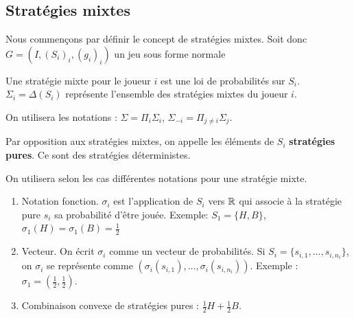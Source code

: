 \subsection{Stratégies mixtes}
Nous commençons par définir le concept de stratégies mixtes. Soit
donc $G = (I, (S_i)_i, (g_i)_i)$ un jeu sous forme normale

\begin{definition} Une strat\'egie mixte pour le joueur
$i$ est une loi de probabilit\'es sur $S_i$. $\Sigma_i
=\Delta(S_i)$ repr\'esente l'ensemble des strat\'egies
mixtes du joueur $i$. %
\end{definition}

On utilisera les notations : $\Sigma = \Pi_i \Sigma_i$,
$\Sigma_{-i} = \Pi_{j\neq i} \Sigma_j$.

Par opposition aux stratégies mixtes, on appelle les éléments de
$S_i$ {\bf stratégies pures}. Ce sont des stratégies
déterministes.

On utilisera selon les cas différentes notations pour une
stratégie mixte.
\begin{enumerate}
\item Notation fonction. $\sigma_i$ est l'application de $S_i$
vers $\mathbb R$ qui associe à la stratégie pure $s_i$ sa probabilité
d'être jouée. Exemple: $S_1=\{H,B\}$,
$\sigma_1(H)=\sigma_1(B)=\frac12$%
\item Vecteur. On écrit $\sigma_i$ comme un vecteur de
probabilités. Si $S_i= \{s_{i,1},\ldots,s_{i,n_i}\}$, on
$\sigma_i$ se représente comme
$(\sigma_i(s_{i,1}),\ldots,\sigma_i(s_{i,n_i}))$. Exemple :
$\sigma_1=(\frac12,\frac12)$. %
\item Combinaison convexe de stratégies pures : $\frac12H +
\frac12B$.
\end{enumerate}

